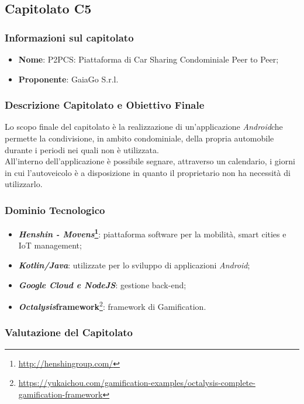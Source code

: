 \subsection{Capitolato C5}\label{C5}

\subsubsection{Informazioni sul capitolato}
\begin{itemize}
  \item \textbf{Nome}: P2PCS: Piattaforma di Car Sharing Condominiale Peer to Peer;
  \item \textbf{Proponente}: GaiaGo S.r.l.
\end{itemize}

\subsubsection{Descrizione Capitolato e Obiettivo Finale}
Lo scopo finale del capitolato è la realizzazione di un'applicazione \textit{Android}\glossario che permette la condivisione, in ambito condominiale, della propria automobile durante i periodi nei quali non è utilizzata.\\
All'interno dell'applicazione è possibile segnare, attraverso un calendario, i giorni in cui l'autoveicolo è a disposizione in quanto il proprietario non ha necessità di utilizzarlo.

\subsubsection{Dominio Tecnologico}
\begin{itemize}
  \item \textbf{\textit{Henshin - Movens}\footnote{\url{http://henshingroup.com/}}}: piattaforma software per la mobilità, smart cities e IoT management;
  \item \textbf{\textit{Kotlin/Java}}: utilizzate per lo sviluppo di applicazioni \textit{Android};
  \item \textbf{\textit{Google Cloud e NodeJS}}: gestione back-end;
  \item \textbf{\textit{Octalysis}\glossario framework}\footnote{\url{https://yukaichou.com/gamification-examples/octalysis-complete-gamification-framework}}: framework di Gamification\glossario.
  
\end{itemize}

\subsubsection{Valutazione del Capitolato}

